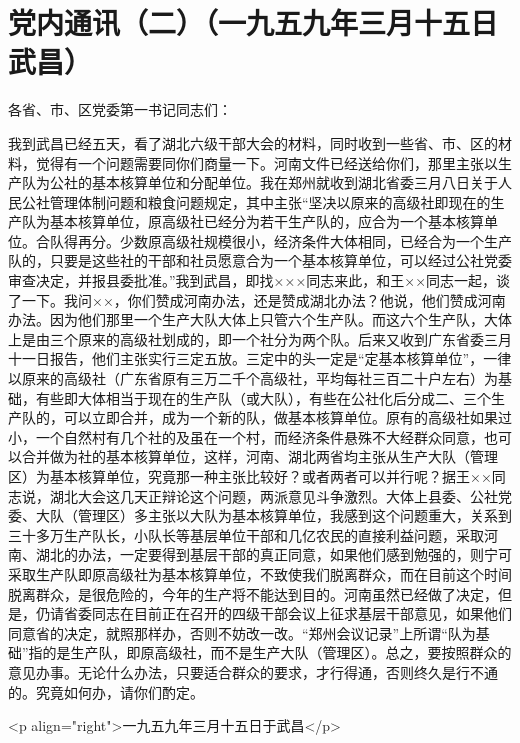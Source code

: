 \section[党内通讯（二）（一九五九年三月十五日武昌）]{党内通讯（二）（一九五九年三月十五日武昌）}


各省、市、区党委第一书记同志们：

我到武昌已经五天，看了湖北六级干部大会的材料，同时收到一些省、市、区的材料，觉得有一个问题需要同你们商量一下。河南文件已经送给你们，那里主张以生产队为公社的基本核算单位和分配单位。我在郑州就收到湖北省委三月八日关于人民公社管理体制问题和粮食问题规定，其中主张“坚决以原来的高级社即现在的生产队为基本核算单位，原高级社已经分为若干生产队的，应合为一个基本核算单位。合队得再分。少数原高级社规模很小，经济条件大体相同，已经合为一个生产队的，只要是这些社的干部和社员愿意合为一个基本核算单位，可以经过公社党委审查决定，并报县委批准。”我到武昌，即找×××同志来此，和王××同志一起，谈了一下。我问××，你们赞成河南办法，还是赞成湖北办法？他说，他们赞成河南办法。因为他们那里一个生产大队大体上只管六个生产队。而这六个生产队，大体上是由三个原来的高级社划成的，即一个社分为两个队。后来又收到广东省委三月十一日报告，他们主张实行三定五放。三定中的头一定是“定基本核算单位”，一律以原来的高级社（广东省原有三万二千个高级社，平均每社三百二十户左右）为基础，有些即大体相当于现在的生产队（或大队），有些在公社化后分成二、三个生产队的，可以立即合并，成为一个新的队，做基本核算单位。原有的高级社如果过小，一个自然村有几个社的及虽在一个村，而经济条件悬殊不大经群众同意，也可以合并做为社的基本核算单位，这样，河南、湖北两省均主张从生产大队（管理区）为基本核算单位，究竟那一种主张比较好？或者两者可以并行呢？据王××同志说，湖北大会这几天正辩论这个问题，两派意见斗争激烈。大体上县委、公社党委、大队（管理区）多主张以大队为基本核算单位，我感到这个问题重大，关系到三十多万生产队长，小队长等基层单位干部和几亿农民的直接利益问题，采取河南、湖北的办法，一定要得到基层干部的真正同意，如果他们感到勉强的，则宁可采取生产队即原高级社为基本核算单位，不致使我们脱离群众，而在目前这个时间脱离群众，是很危险的，今年的生产将不能达到目的。河南虽然已经做了决定，但是，仍请省委同志在目前正在召开的四级干部会议上征求基层干部意见，如果他们同意省的决定，就照那样办，否则不妨改一改。“郑州会议记录”上所谓“队为基础”指的是生产队，即原高级社，而不是生产大队（管理区）。总之，要按照群众的意见办事。无论什么办法，只要适合群众的要求，才行得通，否则终久是行不通的。究竟如何办，请你们酌定。

<p align="right">一九五九年三月十五日于武昌</p>


